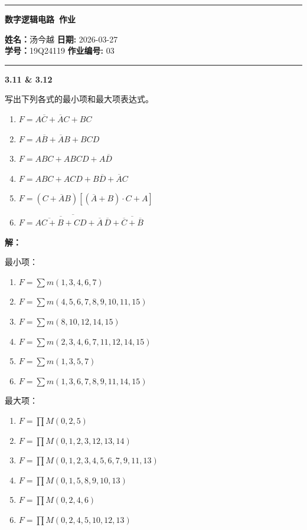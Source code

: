 \documentclass[10pt, a4paper]{article}
\newcommand{\question}[2]{
    \vspace{2ex}\noindent\textbf{#1}\ {\kaishu #2} \par\vspace{1ex}
}
\newcommand{\solution}[1]{
    \noindent\textbf{解：}{\songti #1} \par\vspace{3ex}
}
\begin{document}
\thispagestyle{plain}
\begin{center}
	\hrule
	\vspace{.4cm}
	{\textbf { \large 数字逻辑电路\ 作业}}
\end{center}
{ \textbf{姓名：}}汤今越 \hspace{\fill} \textbf{日期:} 2026-03-27 \\
{ \textbf{学号：}}19Q24119 \hspace{\fill} \textbf{作业编号:} 03 \\
	\hrule
\vspace{3ex}


\question{3.11 \& 3.12}{
写出下列各式的最小项和最大项表达式。
\begin{enumerate}
	\item $ F = A\overline{C} + \overline{A}C + BC $
	\item $ F = A\overline{B} + \overline{A}B + BCD $
	\item $ F = ABC + ABCD + A\overline{D} $
	\item $ F = ABC + ACD + B\overline{D} + \overline{A}C $
	\item $ F = (C + \overline{A}B) [ (\overline{A} + B) \cdot C + A] $
	\item $ F = \overline{\overline{\overline{AC + B} + CD} + \overline{A}\,\overline{D}} + \overline{\overline{C} + \overline{B}} $
\end{enumerate}
}

\solution{
最小项：
\begin{enumerate}
	\item $ F = \sum m(1,3,4,6,7) $
	\item $ F = \sum m(4,5,6,7,8,9,10,11,15) $
	\item $ F = \sum m(8,10,12,14,15) $
	\item $ F = \sum m(2,3,4,6,7,11,12,14,15) $
	\item $ F = \sum m(1,3,5,7) $
	\item $ F = \sum m(1,3,6,7,8,9,11,14,15) $
\end{enumerate}
最大项：
\begin{enumerate}
	\item $ F = \prod M(0,2,5) $
	\item $ F = \prod M(0,1,2,3,12,13,14) $
	\item $ F = \prod M(0,1,2,3,4,5,6,7,9,11,13) $
	\item $ F = \prod M(0,1,5,8,9,10,13) $
	\item $ F = \prod M(0,2,4,6) $
	\item $ F = \prod M(0,2,4,5,10,12,13) $ 
\end{enumerate}
}
\end{document}
